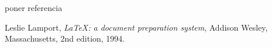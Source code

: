 \renewcommand{\bibname}{Bibliografía}             %
 \renewcommand{\refname}{Bibliografía}             %
 
\begin{thebibliography}{9}
  poner referencia %
  
  Leslie Lamport,
  \emph{\LaTeX: a document preparation system},
  Addison Wesley, Massachusetts,
  2nd edition,
  1994.
  
  

\end{thebibliography}